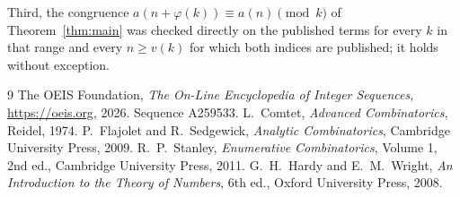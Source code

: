 \documentclass[11pt,a4paper]{article}
\theoremstyle{plain}
\theoremstyle{definition}
\begin{document}
Third, the congruence $a(n+\varphi(k))\equiv a(n)\pmod k$ of Theorem~\ref{thm:main} was
checked directly on the published terms for every $k$ in that range and every $n\ge v(k)$
for which both indices are published; it holds without exception.

\begin{thebibliography}{9}
 The OEIS Foundation, \emph{The On-Line Encyclopedia of Integer
Sequences}, \url{https://oeis.org}, 2026. Sequence A259533.
 L.~Comtet, \emph{Advanced Combinatorics}, Reidel, 1974.
 P.~Flajolet and R.~Sedgewick, \emph{Analytic Combinatorics}, Cambridge
University Press, 2009.
 R.~P.~Stanley, \emph{Enumerative Combinatorics}, Volume 1, 2nd ed.,
Cambridge University Press, 2011.
 G.~H.~Hardy and E.~M.~Wright, \emph{An Introduction to the Theory of
Numbers}, 6th ed., Oxford University Press, 2008.
\end{thebibliography}
\end{document}
